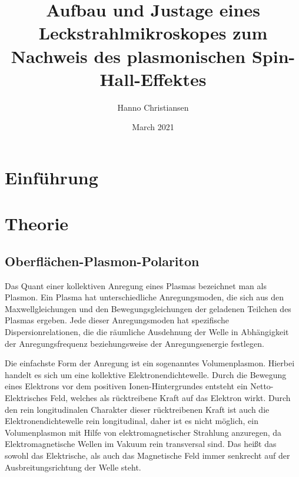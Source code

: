 \documentclass{article}
\title{Aufbau und Justage eines Leckstrahlmikroskopes zum Nachweis des plasmonischen Spin-Hall-Effektes}
\author{Hanno Christiansen}
\date{March 2021}
\begin{document}
	
\maketitle
\tableofcontents

\section{Einführung}
\section{Theorie}
\subsection{Oberflächen-Plasmon-Polariton}
Das Quant einer kollektiven Anregung eines Plasmas bezeichnet man als Plasmon. Ein Plasma hat unterschiedliche Anregungsmoden, die sich aus den Maxwellgleichungen und den Bewegungsgleichungen der geladenen Teilchen des Plasmas ergeben. Jede dieser Anregungsmoden hat spezifische Dispersionrelationen, die die räumliche Ausdehnung der Welle in Abhängigkeit der Anregungsfrequenz beziehungsweise der Anregungsenergie festlegen.

Die einfachste Form der Anregung ist ein sogenanntes Volumenplasmon. Hierbei handelt es sich um eine kollektive Elektronendichtewelle. Durch die Bewegung eines Elektrons vor dem positiven Ionen-Hintergrundes entsteht ein Netto-Elektrisches Feld, welches als rücktreibene Kraft auf das Elektron wirkt. Durch den rein longitudinalen Charakter dieser rücktreibenen Kraft ist auch die Elektronendichtewelle rein longitudinal, daher ist es nicht möglich, ein Volumenplasmon mit Hilfe von elektromagnetischer Strahlung anzuregen, da Elektromagnetische Wellen im Vakuum rein transversal sind. Das heißt das sowohl das Elektrische, als auch das Magnetische Feld immer senkrecht auf der Ausbreitungsrichtung der Welle steht.
\end{document}
